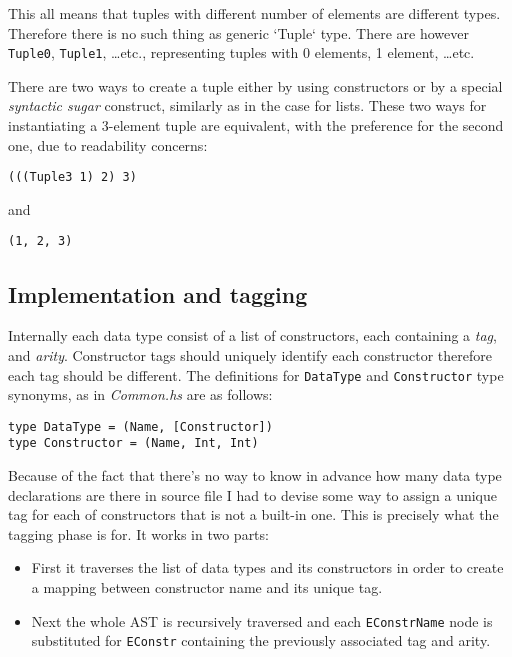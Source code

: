 \documentclass[a4paper]{report}
\begin{document}
This all means that tuples with different number of elements are different
types. Therefore there is no such thing as generic `Tuple` type. There are
however \texttt{Tuple0}, \texttt{Tuple1}, \ldots etc., representing tuples with
0 elements, 1 element, \ldots etc.

There are two ways to create a tuple either by using constructors or by a
special \textit{syntactic sugar} construct, similarly as in the case for lists.
These two ways for instantiating a 3-element tuple are equivalent, with the
preference for the second one, due to readability concerns:

\begin{lstlisting}
(((Tuple3 1) 2) 3)
\end{lstlisting}
and
\begin{lstlisting}
(1, 2, 3)
\end{lstlisting}

\subsection{Implementation and tagging}
Internally each data type consist of a list of constructors, each containing a
\textit{tag}, and \textit{arity}. Constructor tags should uniquely identify
each constructor therefore each tag should be different. The definitions
for \texttt{DataType} and \texttt{Constructor} type synonyms, as in
\textit{Common.hs} are as follows:

\begin{lstlisting}
type DataType = (Name, [Constructor])
type Constructor = (Name, Int, Int)
\end{lstlisting}

Because of the fact that there's no way to know in advance how many data type
declarations are there in source file I had to devise some way to assign a
unique tag for each of constructors that is not a built-in one. This is
precisely what the tagging phase is for. It works in two parts:

\begin{itemize}
  \item First it traverses the list of data types and its constructors in order
    to create a mapping between constructor name and its unique tag.
  \item Next the whole AST is recursively traversed and each
    \texttt{EConstrName} node is substituted for \texttt{EConstr} containing
    the previously associated tag and arity.
\end{itemize}
\end{document}
